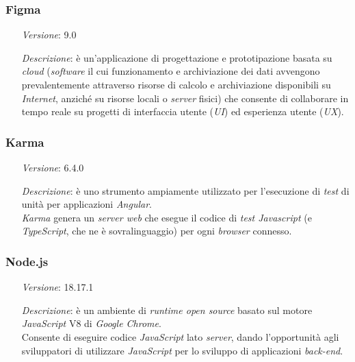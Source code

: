     \subsubsection*{Figma}
    \begin{itemize}
        \item [\textit{Versione}:] 9.0
        \item [\textit{Descrizione}:] è un'applicazione di progettazione e prototipazione basata su \textit{cloud} (\textit{software} il cui funzionamento e archiviazione dei dati avvengono prevalentemente attraverso risorse di calcolo e archiviazione disponibili su \textit{Internet}, anziché su risorse locali o \textit{server} fisici)
                    che consente di collaborare in tempo reale su progetti di interfaccia utente (\textit{UI}) ed esperienza utente (\textit{UX}).
    \end{itemize}

    \subsubsection*{Karma}
    \begin{itemize}
        \item [\textit{Versione}:] 6.4.0
        \item [\textit{Descrizione}:] è uno strumento ampiamente utilizzato per l'esecuzione di \textit{test} di unità per applicazioni \textit{Angular}. \\
                    \textit{Karma} genera un \textit{server web} che esegue il codice di \textit{test Javascript} (e \textit{TypeScript}, che ne è sovralinguaggio) per ogni \textit{browser} connesso.
    \end{itemize}

    \subsubsection*{Node.js}
    \begin{itemize}
        \item [\textit{Versione}:] 18.17.1
        \item [\textit{Descrizione}:] è un ambiente di \textit{runtime open source} basato sul motore \textit{JavaScript} V8 di \textit{Google Chrome}. \\
                    Consente di eseguire codice \textit{JavaScript} lato \textit{server}, dando l'opportunità agli sviluppatori di utilizzare \textit{JavaScript} per lo sviluppo di applicazioni \textit{back-end}.
    \end{itemize}

